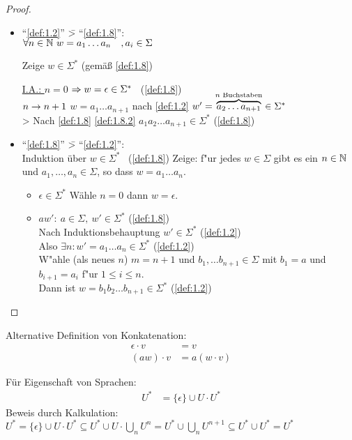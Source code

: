 \begin{proof}\ 
	\begin{itemize}
		\item "`\autoref{def:1.2}"' \=> "`\autoref{def:1.8}"':\\
		$\forall n\in\mathbb{N}\ w=a_1\dots a_n \quad, a_i\in\Sigma$
		
		Zeige $w\in\Sigma^*$ (gemäß \autoref{def:1.8})
		
		\underline{I.A.: $n=0$} $\=> w = \epsilon \in \Sigma^*$ \ (\autoref{def:1.8})\\
		\underline{$n\->n+1$} $w = a_1\dots a_{n+1}$ nach \autoref{def:1.2} $w'=\overbrace{a_2\dots a_{n+1}}^{\smash{n\text{ Buchstaben}}} \in \Sigma^*$\\
		\-> Nach \autoref{def:1.8} \ref{def:1.8.2} $a_1a_2\dots a_{n+1} \in\Sigma^*$ (\autoref{def:1.8})
		\item "`\autoref{def:1.8}"' \=> "`\autoref{def:1.2}"':\\
		Induktion über $w\in\Sigma^*$ \ (\ref{def:1.8})
		Zeige: f"ur jedes $w\in\Sigma$ gibt es ein $n\in\mathbb{N}$ und $a_1, \dots, a_n \in \Sigma$, so dass $w=a_1\dots a_n$.
		\begin{itemize}
			\item $\epsilon\in\Sigma^*$ Wähle $n=0$ dann $w=\epsilon$.
			\item $aw':\ a\in\Sigma,\ w'\in\Sigma^*$ (\ref{def:1.8})\\
			Nach Induktionsbehauptung $w'\in\Sigma^*$ (\autoref{def:1.2})\\
			Also $\exists n: w'=a_1\dots a_n\in\Sigma^*$ (\autoref{def:1.2})\\
			W"ahle (als neues $n$) $m = n+1$ und $b_1, \dots b_{n+1} \in\Sigma$
			mit $b_1 = a$ und $b_{i+1} = a_i$ f"ur $1\le i\le n$.\\
			Dann ist $w = b_1b_2\dots b_{n+1}\in\Sigma^*$ (\ref{def:1.2}) \qedhere
	\end{itemize}
	\end{itemize}
\end{proof}
Alternative Definition von Konkatenation:
\begin{align*}
	\epsilon\cdot v &= v\\
	(aw)\cdot v &= a(w\cdot v)
\end{align*}
%
\begin{Bsp*} Für Eigenschaft von Sprachen:
	\begin{align*}
		U^* &= \{\epsilon\}\cup U\cdot U^*
	\end{align*}
	Beweis durch Kalkulation:
	$U^*=\{\epsilon\}\cup U\cdot U^*\subseteq U^*\cup U\cdot\bigcup_n U^n = U^*\cup\bigcup_n U^{n+1} \subseteq U^*\cup U^* = U^*$
\end{Bsp*}
